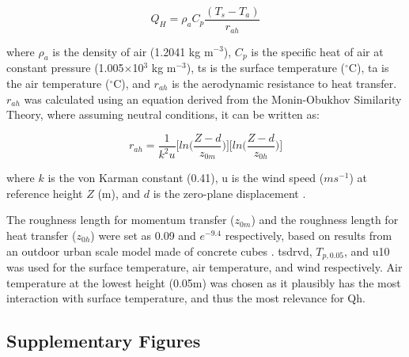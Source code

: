 \documentclass[final,3p,times,authoryear]{elsarticle}
\begin{document}
\begin{equation}
Q_{H} = \rho_{a}C_{p} \frac{ (T_{s} - T_{a}) }{r_{ah}}
\label{eq:7.12}
\end{equation}

where $\rho_{a}$ is the density of air (1.2041 kg m$^{-3}$), $C_{p}$ is the specific heat of air at constant pressure (1.005$\times$10$^{3}$ kg m$^{-3}$), \gls{ts} is the surface temperature ($^{\circ}$C), \gls{ta} is the air temperature ($^{\circ}$C), and $r_{ah}$ is the aerodynamic resistance to heat transfer. $r_{ah}$ was calculated using an equation derived from the Monin-Obukhov Similarity Theory, where assuming neutral conditions, it can be written as:

\begin{equation}
r_{ah} = \frac{1}{k^{2}u}\bigg[ln\bigg( \frac{Z-d}{z_{0m}} \bigg) \bigg] \bigg[ln\bigg( \frac{Z-d}{z_{0h}} \bigg) \bigg]
\label{eq:7.13}
\end{equation}

where $k$ is the von Karman constant (0.41), \gls{u} is the wind speed ($ms^{-1}$) at reference
height $Z$ (m), and $d$ is the zero-plane displacement \citep{Liu2007}.

The roughness length for momentum transfer ($z_{0m}$) and the roughness length for heat transfer ($z_{0h}$) were set as 0.09 and $e^{-9.4}$ respectively, based on results from an outdoor urban scale model made of concrete cubes \citep{Kanda2007}. \gls{tsdrvd}, $T_{p,0.05}$, and \gls{u10} was used for the surface temperature, air temperature, and wind respectively. Air temperature at the lowest height (0.05m) was chosen as it plausibly has the most interaction with surface temperature, and thus the most relevance for \gls{Qh}.


\subsection{Supplementary Figures}\label{sec:suppfig}
\end{document}
